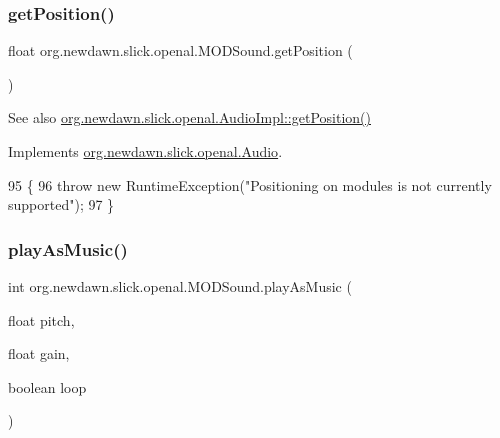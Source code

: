 \subsubsection{\texorpdfstring{get\+Position()}{getPosition()}}
{\footnotesize\ttfamily float org.\+newdawn.\+slick.\+openal.\+M\+O\+D\+Sound.\+get\+Position (\begin{DoxyParamCaption}{ }\end{DoxyParamCaption})\hspace{0.3cm}{\ttfamily [inline]}}

\begin{DoxySeeAlso}{See also}
\mbox{\hyperlink{classorg_1_1newdawn_1_1slick_1_1openal_1_1_audio_impl_a71aa3ed24fc3e7e4e8603b89250b35bd}{org.\+newdawn.\+slick.\+openal.\+Audio\+Impl\+::get\+Position()}} 
\end{DoxySeeAlso}


Implements \mbox{\hyperlink{interfaceorg_1_1newdawn_1_1slick_1_1openal_1_1_audio_aa838b5606c0aa5f23dd46ac5918bb717}{org.\+newdawn.\+slick.\+openal.\+Audio}}.


\begin{DoxyCode}
95                                \{
96         \textcolor{keywordflow}{throw} \textcolor{keyword}{new} RuntimeException(\textcolor{stringliteral}{"Positioning on modules is not currently supported"});
97     \}
\end{DoxyCode}
\mbox{\label{classorg_1_1newdawn_1_1slick_1_1openal_1_1_m_o_d_sound_a36e50d276fcfb6cc72c209abc9a9bdee}} 
\subsubsection{\texorpdfstring{play\+As\+Music()}{playAsMusic()}}
{\footnotesize\ttfamily int org.\+newdawn.\+slick.\+openal.\+M\+O\+D\+Sound.\+play\+As\+Music (\begin{DoxyParamCaption}\item[{float}]{pitch,  }\item[{float}]{gain,  }\item[{boolean}]{loop }\end{DoxyParamCaption})\hspace{0.3cm}{\ttfamily [inline]}}


